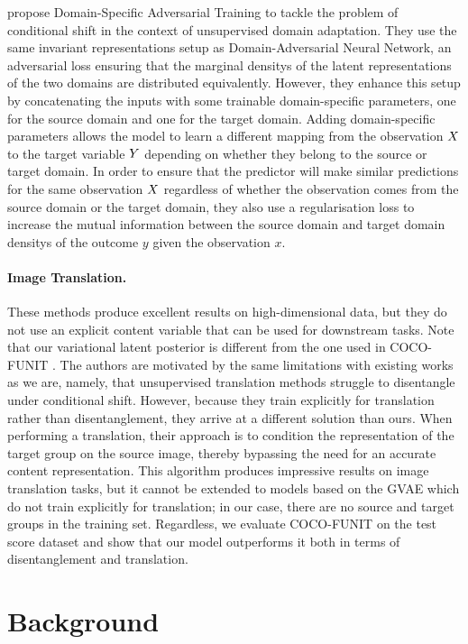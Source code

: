 \documentclass[../thesis.tex]{subfiles}
\begin{document}
\citet{stojanovDomainAdaptationInvariant2021} propose Domain-Specific Adversarial Training to tackle the problem of conditional shift in the context of unsupervised domain adaptation. They use the same invariant representations setup as Domain-Adversarial Neural Network, an adversarial loss ensuring that the marginal densitys of the latent representations of the two domains are distributed equivalently. However, they enhance this setup by concatenating the inputs with some trainable domain-specific parameters, one for the source domain and one for the target domain. Adding domain-specific parameters allows the model to learn a different mapping from the observation $\myrv{x}$ to the target variable $\myrv{y}$ depending on whether they belong to the source or target domain. In order to ensure that the predictor will make similar predictions for the same observation $\myrv{x}$ regardless of whether the observation comes from the source domain or the target domain, they also use a regularisation loss to increase the mutual information between the source domain and target domain densitys of the outcome $y$ given the observation $x$.

\paragraph{Image Translation.} These methods produce excellent results on high-dimensional data, but they do not use an explicit content variable that can be used for downstream tasks. Note that our variational latent posterior is different from the one used in COCO-FUNIT \citep{saitoCOCOFUNITFewShotUnsupervised2020}. The authors are motivated by the same limitations with existing works as we are, namely, that unsupervised translation methods struggle to disentangle under conditional shift. However, because they train explicitly for translation rather than disentanglement, they arrive at a different solution than ours. When performing a translation, their approach is to condition the representation of the target group on the source image, thereby bypassing the need for an accurate content representation. This algorithm produces impressive results on image translation tasks, but it cannot be extended to models based on the GVAE which do not train explicitly for translation; in our case, there are no source and target groups in the training set. Regardless, we evaluate COCO-FUNIT on the test score dataset and show that our model outperforms it both in terms of disentanglement and translation.

\section{Background}
\end{document}
